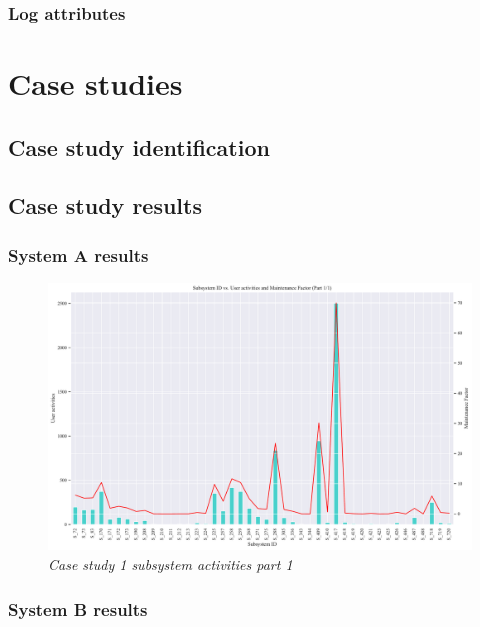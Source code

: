 \clearpage

\subsubsection{Log attributes}

\section{Case studies}

\subsection{Case study identification}

\subsection{Case study results}

\subsubsection{System A results}

\begin{landscape}
	\begin{figure}[!htb]
		\centering %
		\includegraphics[width=0.95\linewidth]{img/ch3/analysis/case_A_subsystems_1.pdf}
		\caption[Case study 1 subsystem activities part 1]
		{\textit{Case study 1 subsystem activities part 1}}\label{fig:ch3_saS1S246}
	\end{figure} 
\end{landscape}

\subsubsection{System B results}


